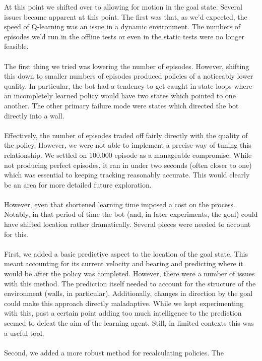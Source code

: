 \documentclass{aiaa-tc}%
\begin{document}
At this point we shifted over to allowing for motion in the goal
state. Several issues became apparent at this point. The first was that, as we'd expected, the
speed of Q-learning was an issue in a dynamic environment. The numbers
of episodes we'd run in the offline tests or even in the
static tests were no
longer feasible.  \\ \\
The first thing we tried was lowering the number of episodes. 
However, shifting this down to smaller numbers of episodes produced policies of a noticeably lower quality. In
particular, the bot had a tendency to get caught in state loops where
an incompletely learned policy would have two states which pointed to
one another. The other primary failure mode were states which directed
the bot directly into a wall. \\ \\
Effectively, the number of episodes traded off fairly directly with
the quality of the policy. However, we were not able to implement a
precise way of tuning this relationship. We settled on 100,000 episode as a manageable
compromise. While not producing perfect episodes, it ran in under two
seconds (often closer to one) which was essential to
keeping tracking reasonably accurate. This would clearly be an area
for more detailed future exploration. \\ \\
However, even that shortened learning time imposed a cost on the process. Notably, in
that period of time the bot (and, in later experiments, the goal)
could have shifted location rather dramatically. Several pieces were
needed to account for this. \\ \\
First, we added a basic predictive aspect to the location of the goal
state. This meant accounting for its current velocity and bearing and
predicting where it would be after the policy was completed. However,
there were a number of issues with this method. The prediction itself
needed to account for the structure of the environment (walls, in
particular). Additionally, changes in direction by the goal could make
this approach directly maladaptive. While we kept experimenting with
this, past a certain point adding too much intelligence to the
prediction seemed to defeat the aim of the learning agent. Still, in
limited contexts this was a useful tool. \\ \\
Second, we added a more robust method for recalculating policies. The
\end{document}
